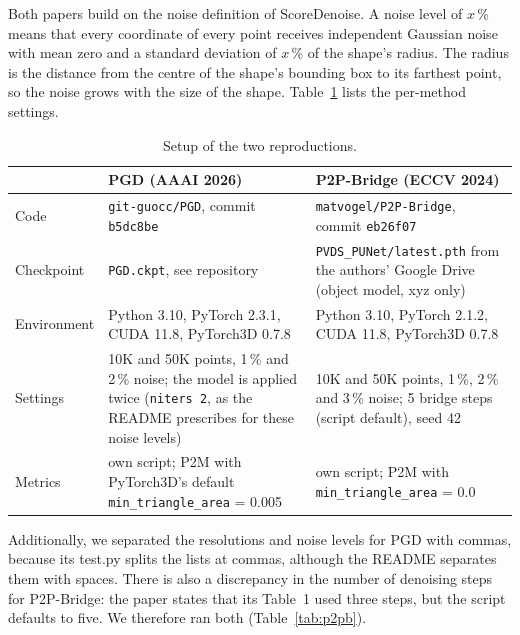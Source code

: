 \documentclass[11pt,a4paper]{article}
\begin{document}
Both papers build on the noise definition of ScoreDenoise.
A noise level of $x$\,\% means that every coordinate of every point receives independent Gaussian noise with mean zero and a standard deviation of $x$\,\% of the shape's radius.
The radius is the distance from the centre of the shape's bounding box to its farthest point, so the noise grows with the size of the shape.
Table~\ref{tab:setup} lists the per-method settings.

\begin{table}[H]
\centering\small\renewcommand{\arraystretch}{1.3}%
\begin{tabularx}{\linewidth}{@{}>{\raggedright\arraybackslash}p{2.4cm}>{\raggedright\arraybackslash}X>{\raggedright\arraybackslash}X@{}}
\toprule
 & \textbf{PGD} (AAAI 2026) & \textbf{P2P-Bridge} (ECCV 2024) \\
\midrule
Code & \texttt{git-guocc/PGD}, commit \texttt{b5dc8be} & \texttt{matvogel/P2P-Bridge}, commit \texttt{eb26f07} \\
Checkpoint & \texttt{PGD.ckpt}, see repository & \texttt{PVDS\_PUNet/latest.pth} from the authors' Google Drive (object model, xyz only) \\
Environment & Python 3.10, PyTorch 2.3.1, CUDA 11.8, PyTorch3D 0.7.8 & Python 3.10, PyTorch 2.1.2, CUDA 11.8, PyTorch3D 0.7.8 \\
Settings & 10K and 50K points, 1\,\% and 2\,\% noise; the model is applied twice (\texttt{niters 2}, as the README prescribes for these noise levels) & 10K and 50K points, 1\,\%, 2\,\% and 3\,\% noise; 5 bridge steps (script default), seed 42 \\
Metrics & own script; P2M with PyTorch3D's default \texttt{min\_triangle\_area} = 0.005 & own script; P2M with \texttt{min\_triangle\_area} = 0.0 \\
\bottomrule
\end{tabularx}
\caption{Setup of the two reproductions.}
\label{tab:setup}
\end{table}

\noindent Additionally, we separated the resolutions and noise levels for PGD with commas, because its test.py splits the lists at commas, although the README separates them with spaces. There is also a discrepancy in the number of denoising steps for P2P-Bridge: the paper states that its Table~1 used three steps, but the script defaults to five. We therefore ran both (Table~\ref{tab:p2pb}).
\end{document}
